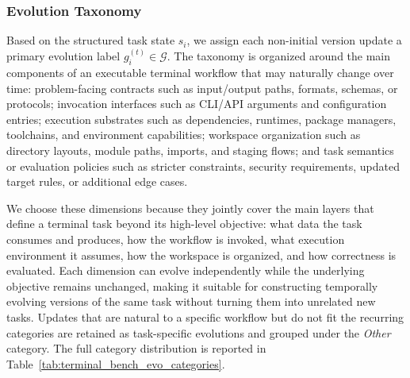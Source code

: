 \documentclass{llmxive}
\begin{document}
\subsubsection{Evolution Taxonomy}
\label{app:terminal_taxonomy}
Based on the structured task state $s_i$, we assign each non-initial version update a primary evolution label $g_i^{(t)} \in \mathcal{G}$. The taxonomy is organized around the main components of an executable terminal workflow that may naturally change over time: problem-facing contracts such as input/output paths, formats, schemas, or protocols; invocation interfaces such as CLI/API arguments and configuration entries; execution substrates such as dependencies, runtimes, package managers, toolchains, and environment capabilities; workspace organization such as directory layouts, module paths, imports, and staging flows; and task semantics or evaluation policies such as stricter constraints, security requirements, updated target rules, or additional edge cases.

We choose these dimensions because they jointly cover the main layers that define a terminal task beyond its high-level objective: what data the task consumes and produces, how the workflow is invoked, what execution environment it assumes, how the workspace is organized, and how correctness is evaluated. Each dimension can evolve independently while the underlying objective remains unchanged, making it suitable for constructing temporally evolving versions of the same task without turning them into unrelated new tasks. Updates that are natural to a specific workflow but do not fit the recurring categories are retained as task-specific evolutions and grouped under the \emph{Other} category. The full category distribution is reported in Table~\ref{tab:terminal_bench_evo_categories}.
\end{document}
